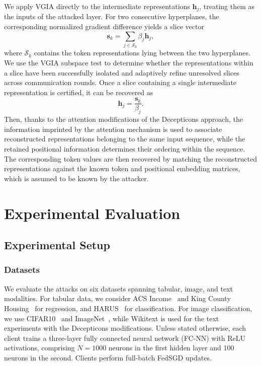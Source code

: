 We apply VGIA directly to the intermediate representations $\mathbf{h}_j$, treating them as the inputs of the attacked layer. For two consecutive hyperplanes, the corresponding normalized gradient difference yields a slice vector
\[
    \mathbf{s}_k
    =
    \sum_{j\in\mathcal{S}_k}
    \beta_j \mathbf{h}_j,
\]
where $\mathcal{S}_k$ contains the token representations lying between the two hyperplanes. We use the VGIA subspace test to determine whether the representations within a slice have been successfully isolated and adaptively refine unresolved slices across communication rounds. Once a slice containing a single intermediate representation is certified, it can be recovered as
\[
    \mathbf{h}_j = \frac{\mathbf{s}_k}{\beta_j}.
\]
Then, thanks to the attention modifications of the Decepticons approach, the information imprinted by the attention mechanism is used to associate reconstructed representations belonging to the same input sequence, while the retained positional information determines their ordering within the sequence. The corresponding token values are then recovered by matching the reconstructed representations against the known token and positional embedding matrices, which is assumed to be known by the attacker.


\section{Experimental Evaluation}
\subsection{Experimental Setup}
\subsubsection{Datasets}
We evaluate the attacks on six datasets spanning tabular, image, and text modalities. For tabular data, we consider ACS Income~\cite{income_dataset} and King County Housing~\cite{kingcountyhousing} for regression, and HARUS~\cite{harus} for classification. For image classification, we use CIFAR10~\cite{cifar10} and ImageNet~\cite{imagenet}, while Wikitext\cite{wikitext} is used for the text experiments with the Decepticons modifications. Unless stated otherwise, each client trains a three-layer fully connected neural network (FC-NN) with ReLU activations, comprising \(N=1000\) neurons in the first hidden layer and 100 neurons in the second. Clients perform full-batch FedSGD updates.
